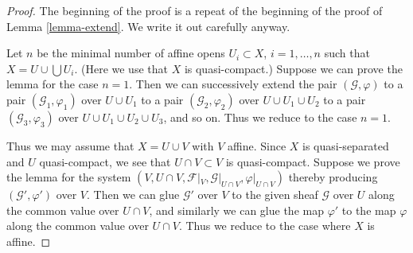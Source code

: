 \documentclass{amsart}
\theoremstyle{plain}
\theoremstyle{definition}
\theoremstyle{remark}
\numberwithin{equation}{subsection}
\begin{document}
\begin{proof}
The beginning of the proof is a repeat of the beginning of the
proof of Lemma \ref{lemma-extend}. We write it out carefully anyway.

\medskip\noindent
Let $n$ be the minimal number of affine opens $U_i \subset X$,
$i = 1, \ldots , n$ such that $X = U \cup \bigcup U_i$.
(Here we use that $X$ is quasi-compact.) Suppose
we can prove the lemma for the case $n = 1$. Then we can successively
extend the pair $(\mathcal{G}, \varphi)$
to a pair $(\mathcal{G}_1, \varphi_1)$ over $U \cup U_1$
to a pair $(\mathcal{G}_2, \varphi_2)$ over $U \cup U_1 \cup U_2$
to a pair $(\mathcal{G}_3, \varphi_3)$ over $U \cup U_1 \cup U_2 \cup U_3$,
and so on.
Thus we reduce to the case $n = 1$.

\medskip\noindent
Thus we may assume that $X = U \cup V$ with $V$ affine.
Since $X$ is quasi-separated and $U$ quasi-compact,
we see that $U \cap V \subset V$ is quasi-compact.
Suppose we prove the lemma for the system
$(V, U \cap V, \mathcal{F}|_V, \mathcal{G}|_{U \cap V}, \varphi|_{U \cap V})$
thereby producing $(\mathcal{G}', \varphi')$ over $V$.
Then we can glue $\mathcal{G}'$ over $V$ to the given sheaf $\mathcal{G}$
over $U$ along the common value over $U \cap V$, and similarly we can glue
the map $\varphi'$ to the map $\varphi$ along the common value over
$U \cap V$. Thus we reduce to the case where $X$ is affine.


\end{proof}
\end{document}
